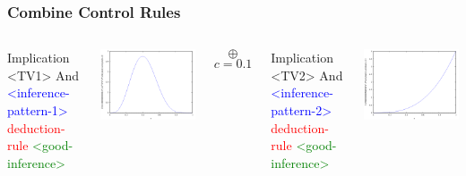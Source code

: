 \documentclass{beamer}
\begin{document}
\begin{frame}[fragile]
  \frametitle{Combine Control Rules}

\begin{columns}

\column{1.1in}

{\tiny
\begin{semiverbatim}
Implication <TV1>
  And
    \textcolor{blue}{<inference-pattern-1>}
    \textcolor{red}{deduction-rule}
  \textcolor{green}{<good-inference>}
\end{semiverbatim}
}

\includegraphics[scale=0.2]{images/Beta_4_6_alpha.png}

\column{0.4in}
\begin{center}
  $$\oplus$$
  {\tiny $$c=0.1$$}
\end{center}

\column{1.3in}

{\tiny
\begin{semiverbatim}
Implication <TV2>
  And
    \textcolor{blue}{<inference-pattern-2>}
    \textcolor{red}{deduction-rule}
  \textcolor{green}{<good-inference>}
\end{semiverbatim}
}

\includegraphics[scale=0.2]{images/Beta_3_0_alpha.png}


\end{columns}
\end{frame}
\end{document}
